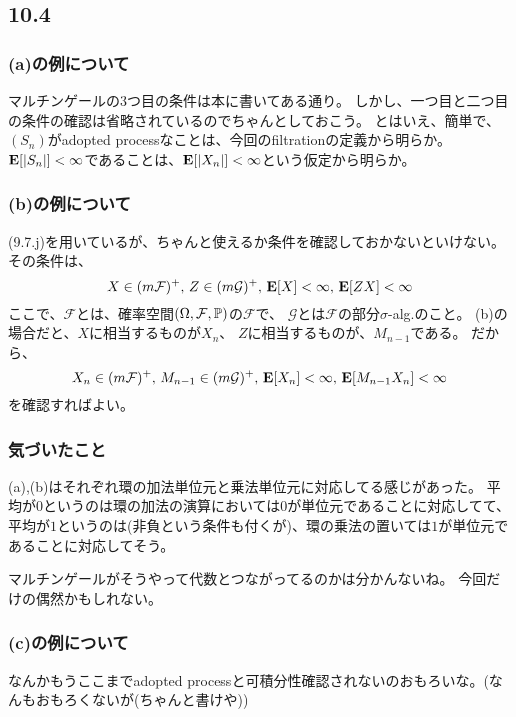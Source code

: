     \subsection{10.4}
      \subsubsection{(a)の例について}
        マルチンゲールの3つ目の条件は本に書いてある通り。
        しかし、一つ目と二つ目の条件の確認は省略されているのでちゃんとしておこう。
        とはいえ、簡単で、$(S_n)$がadopted processなことは、今回のfiltrationの定義から明らか。
        ${\mathbf{E}}[|S_n|] < \infty$であることは、${\mathbf{E}}[|X_n|] < \infty$という仮定から明らか。
      \subsubsection{(b)の例について}
          (9.7.j)を用いているが、ちゃんと使えるか条件を確認しておかないといけない。
          その条件は、
          \[
            X \in (m\mathcal{F})^+ ,\, Z \in (m\mathcal{G})^+, \, {\mathbf{E}}[X] < \infty , \, {\mathbf{E}}[ZX] < \infty
          \]
          ここで、$\mathcal{F}$とは、確率空間$(\Omega, \mathcal{F},{\mathbb{P}})$の$\mathcal{F}$で、
          $\mathcal{G}$とは$\mathcal{F}$の部分$\sigma$-alg.のこと。
          (b)の場合だと、$X$に相当するものが$X_n$、
          $Z$に相当するものが、$M_{n-1}$である。
          だから、
          \[
            X_n \in (m\mathcal{F})^+ ,\, M_{n-1} \in (m\mathcal{G})^+, \, {\mathbf{E}}[X_n] < \infty , \, {\mathbf{E}}[M_{n-1}X_n] < \infty
          \]
          を確認すればよい。

      \subsubsection{気づいたこと}
        (a),(b)はそれぞれ環の加法単位元と乗法単位元に対応してる感じがあった。
        平均が$0$というのは環の加法の演算においては$0$が単位元であることに対応してて、
        平均が$1$というのは(非負という条件も付くが)、環の乗法の置いては$1$が単位元であることに対応してそう。

        マルチンゲールがそうやって代数とつながってるのかは分かんないね。
        今回だけの偶然かもしれない。

      \subsubsection{(c)の例について}
        なんかもうここまでadopted processと可積分性確認されないのおもろいな。(なんもおもろくないが(ちゃんと書けや))

